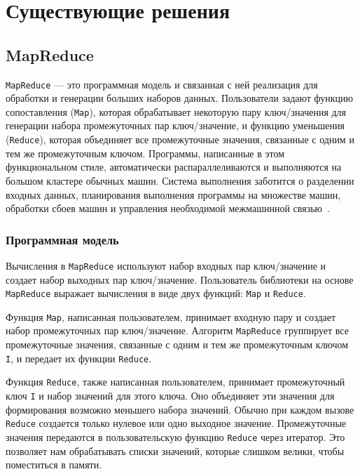 \section{Существующие решения}
\subsection{MapReduce}

\texttt{MapReduce} --- это программная модель и связанная с ней реализация для обработки и генерации больших наборов данных. 
Пользователи задают функцию сопоставления (\texttt{Map}), которая обрабатывает некоторую пару ключ/значения для генерации набора промежуточных пар ключ/значение, и функцию уменьшения (\texttt{Reduce}), которая объединяет все промежуточные значения, связанные с одним и тем же промежуточным ключом. 
Программы, написанные в этом функциональном стиле, автоматически распараллеливаются и выполняются на большом кластере обычных машин. 
Система выполнения заботится о разделении входных данных, планирования выполнения программы на множестве машин, обработки сбоев машин и управления необходимой межмашинной связью~\cite{google-mapreduce}.

\subsubsection{Программная модель}

Вычисления в \texttt{MapReduce} используют набор входных пар ключ/значение и создает набор выходных пар ключ/значение. 
Пользователь библиотеки на основе \texttt{MapReduce} выражает вычисления в виде двух функций: \texttt{Map} и \texttt{Reduce}.

Функция \texttt{Map}, написанная пользователем, принимает входную пару и создает набор промежуточных пар ключ/значение. 
Алгоритм \texttt{MapReduce} группирует все промежуточные значения, связанные с одним и тем же промежуточным ключом \texttt{I}, и передает их функции \texttt{Reduce}.

Функция \texttt{Reduce}, также написанная пользователем, принимает промежуточный ключ \texttt{I} и набор значений для этого ключа. 
Оно объединяет эти значения для формирования возможно меньшего набора значений. 
Обычно при каждом вызове \texttt{Reduce} создается только нулевое или одно выходное значение. 
Промежуточные значения передаются в пользовательскую функцию \texttt{Reduce} через итератор.
Это позволяет нам обрабатывать списки значений, которые слишком велики, чтобы поместиться в памяти.

